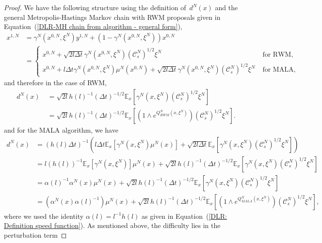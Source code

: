 \begin{proof}
 We have the following structure using the definition of~$d^N(x)$ and the general Metropolis-Hastings Markov chain with RWM proposals given in Equation~(\ref{DLR-MH chain from algorithm - general form}), 
 \begin{align*}
   x^{1,N} &  = \gamma^N(x^{0,N}, \xi^N) y^{1,N} + (1- \gamma^N(x^{0,N}, \xi^N) ) x^{0,N} \\
   &  = 
   \begin{cases}
     x^{0,N}  + \sqrt{2l \Delta t} \gamma^N(x^{0,N}, \xi^N) (\mathcal{C}_s^N)^{1/2} \xi^N \; & \text{for RWM,} \\
     x^{0,N}  + l \Delta t \gamma^N(x^{0,N}, \xi^N)  \mu^N(x^{0,N}) + \sqrt{2l \Delta t} \gamma^N(x^{0,N}, \xi^N) (\mathcal{C}_s^N)^{1/2} \xi^N \; & \text{for MALA,}
   \end{cases}
 \end{align*}
 and therefore in the case of RWM,
 \begin{equation*}
   \begin{split}
      d^N(x) & \; = \sqrt{2l}h(l)^{-1} (\Delta t)^{-1/2} \mathbb{E}_x[\gamma^N(x, \xi^N)(\mathcal{C}_s^N)^{1/2} \xi^N] \\
      & \; = \sqrt{2l}h(l)^{-1} (\Delta t)^{-1/2}  \mathbb{E}_x[ (1 \wedge e^{Q^N_{RWM}(x, \xi^N)}) (\mathcal{C}_s^N)^{1/2} \xi^N].
   \end{split}
 \end{equation*}
 and for the MALA algorithm, we have
  \begin{equation*}
   \begin{split}
     d^N(x) &  = (h(l) \Delta t)^{-1} \left( l \Delta t \mathbb{E}_x[\gamma^N(x, \xi^N)\mu^N(x)] +   \sqrt{2l\Delta t} \mathbb{E}_x[\gamma^N(x, \xi^N)(\mathcal{C}_s^N)^{1/2} \xi^N] \right) \\
      &  = l (h(l))^{-1}  \mathbb{E}_x[ \gamma^N(x, \xi^N)] \mu^N(x) +  \sqrt{2l}h(l)^{-1} (\Delta t)^{-1/2} \mathbb{E}_x[\gamma^N(x, \xi^N)(\mathcal{C}_s^N)^{1/2} \xi^N]  \\
      &  = \alpha(l)^{-1} \alpha^N(x) \mu^N(x) +   \sqrt{2l}h(l)^{-1} (\Delta t)^{-1/2} \mathbb{E}_x[\gamma^N(x, \xi^N)(\mathcal{C}_s^N)^{1/2} \xi^N] \\
      &  =  ( \alpha^N(x) \alpha(l)^{-1} ) \mu^N(x) +   \sqrt{2l}h(l)^{-1} (\Delta t)^{-1/2} \mathbb{E}_x[ (1 \wedge e^{Q^N_{MALA}(x, \xi^N)}) (\mathcal{C}_s^N)^{1/2} \xi^N],
   \end{split}
 \end{equation*}
 where we used the identity $\alpha(l) = l^{-1} h(l)$ as given in Equation~(\ref{DLR: Definition speed function}). As mentioned above, the difficulty lies in the perturbation term

\end{proof}
